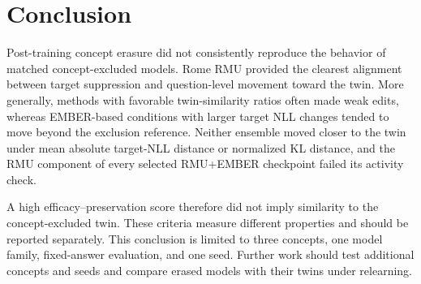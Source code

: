 \section{Conclusion}
\label{sec:conclusion}

Post-training concept erasure did not consistently reproduce the behavior of
matched concept-excluded models. Rome RMU provided the clearest alignment
between target suppression and question-level movement toward the twin. More
generally, methods with favorable twin-similarity ratios often made weak edits,
whereas EMBER-based conditions with larger target NLL changes tended to move
beyond the exclusion reference. Neither ensemble moved closer to the twin
under mean absolute target-NLL distance or normalized KL distance, and the RMU
component of every selected RMU+EMBER checkpoint failed its activity check.

A high efficacy--preservation score therefore did not imply similarity to the
concept-excluded twin. These criteria measure different properties and should
be reported separately. This conclusion is limited to three concepts, one
model family, fixed-answer evaluation, and one seed. Further work should test
additional concepts and seeds and compare erased models with their twins under
relearning.

